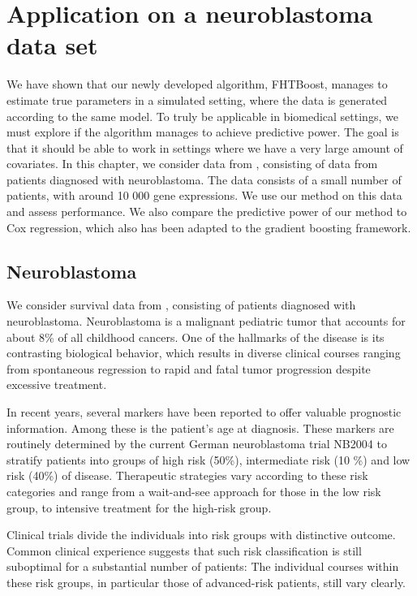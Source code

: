 \chapter{Application on a neuroblastoma data set}
We have shown that our newly developed algorithm, FHTBoost, manages to estimate true parameters in a simulated setting, where the data is generated according to the same model.
To truly be applicable in biomedical settings, we must explore if the algorithm manages to achieve predictive power.
The goal is that it should be able to work in settings where we have a very large amount of covariates.
In this chapter, we consider data from \citet{oberthuer-data}, consisting of data from patients diagnosed with neuroblastoma.
The data consists of a small number of patients, with around 10 000 gene expressions.
We use our method on this data and assess performance.
We also compare the predictive power of our method to Cox regression, which also has been adapted to the gradient boosting framework.

\section{Neuroblastoma}
We consider survival data from \citet{oberthuer-data}, consisting of patients diagnosed with neuroblastoma.
Neuroblastoma is a malignant pediatric tumor that accounts for about 8\% of all childhood cancers.
One of the hallmarks of the disease is its contrasting biological behavior, which results in diverse clinical courses ranging from spontaneous regression to rapid and fatal tumor progression despite excessive treatment.

In recent years, several markers have been reported to offer valuable prognostic information.
Among these is the patient's age at diagnosis.
These markers are routinely determined by the current German neuroblastoma trial NB2004 to stratify patients into groups of high risk (50\%),
intermediate risk (10 \%) and low risk (40\%) of disease.
Therapeutic strategies vary according to these risk categories and range from a wait-and-see approach for those in the low risk group,
to intensive treatment for the high-risk group.

Clinical trials divide the individuals into risk groups with distinctive outcome.
Common clinical experience suggests that such risk classification is still suboptimal for a substantial number of patients:
The individual courses within these risk groups,
in particular those of advanced-risk patients, still vary clearly.

